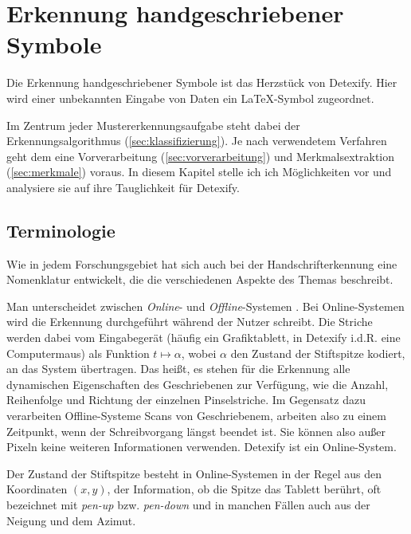 

\chapter{Erkennung handgeschriebener Symbole}

\label{cha:erkennung}

Die Erkennung handgeschriebener Symbole ist das Herzstück von Detexify. Hier wird einer unbekannten Eingabe von Daten ein \LaTeX-Symbol zugeordnet.

Im Zentrum jeder Mustererkennungsaufgabe steht dabei der Erkennungsalgorithmus (\ref{sec:klassifizierung}). Je nach verwendetem Verfahren geht dem eine Vorverarbeitung (\ref{sec:vorverarbeitung}) und Merkmalsextraktion (\ref{sec:merkmale}) voraus. In diesem Kapitel stelle ich ich Möglichkeiten vor und analysiere sie auf ihre Tauglichkeit für Detexify.

\section{Terminologie}

\label{sec:terminologie}

Wie in jedem Forschungsgebiet hat sich auch bei der Handschrifterkennung eine Nomenklatur entwickelt, die die verschiedenen Aspekte des Themas beschreibt.

Man unterscheidet zwischen \emph{Online}- und \emph{Offline}-Systemen \cite{Tappert:1990p10302}. Bei Online-Systemen wird die Erkennung durchgeführt während der Nutzer schreibt. Die Striche werden dabei vom Eingabegerät (häufig ein Grafiktablett, in Detexify i.d.R. eine Computermaus) als Funktion \( t \mapsto \alpha \), wobei \( \alpha \) den Zustand der Stiftspitze kodiert, an das System übertragen. Das heißt, es stehen für die Erkennung alle dynamischen Eigenschaften des Geschriebenen zur Verfügung, wie die Anzahl, Reihenfolge und Richtung der einzelnen Pinselstriche. Im Gegensatz dazu verarbeiten Offline-Systeme Scans von Geschriebenem, arbeiten also zu einem Zeitpunkt, wenn der Schreibvorgang längst beendet ist. Sie können also außer Pixeln keine weiteren Informationen verwenden. Detexify ist ein Online-System.

Der Zustand der Stiftspitze besteht in Online-Systemen in der Regel aus den Koordinaten $(x,y)$, der Information, ob die Spitze das Tablett berührt, oft bezeichnet mit \emph{pen-up} bzw. \emph{pen-down} und in manchen Fällen auch aus der Neigung und dem Azimut.

